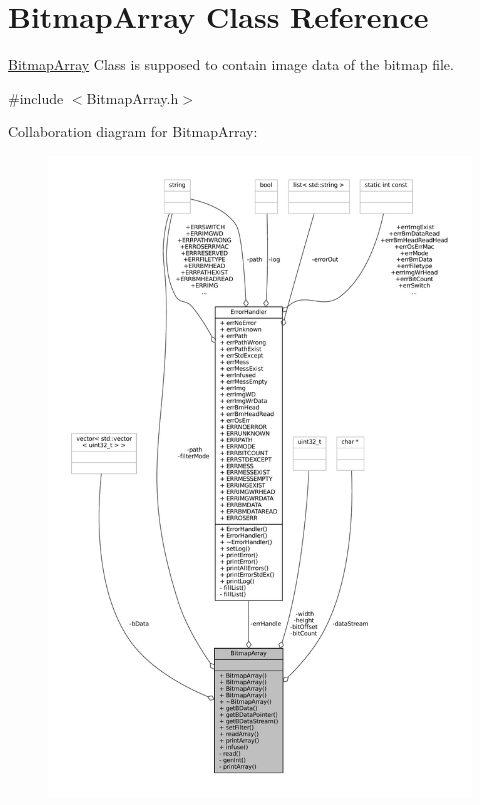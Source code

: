 \hypertarget{classBitmapArray}{}\section{Bitmap\+Array Class Reference}
\label{classBitmapArray}


\mbox{\hyperlink{classBitmapArray}{Bitmap\+Array}} Class is supposed to contain image data of the bitmap file.  




{\ttfamily \#include $<$Bitmap\+Array.\+h$>$}



Collaboration diagram for Bitmap\+Array\+:
\nopagebreak
\begin{figure}[H]
\begin{center}
\leavevmode
\includegraphics[width=350pt]{classBitmapArray__coll__graph}
\end{center}
\end{figure}
